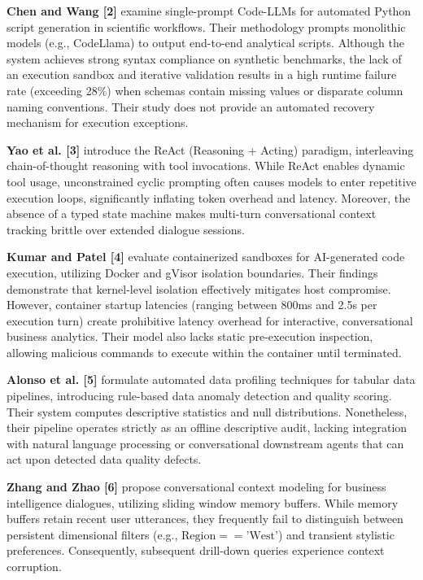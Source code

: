 \documentclass[conference]{IEEEtran}
\begin{document}
\textbf{Chen and Wang [2]} examine single-prompt Code-LLMs for automated Python script generation in scientific workflows. Their methodology prompts monolithic models (e.g., CodeLlama) to output end-to-end analytical scripts. Although the system achieves strong syntax compliance on synthetic benchmarks, the lack of an execution sandbox and iterative validation results in a high runtime failure rate (exceeding 28\%) when schemas contain missing values or disparate column naming conventions. Their study does not provide an automated recovery mechanism for execution exceptions.

\textbf{Yao et al. [3]} introduce the ReAct (Reasoning + Acting) paradigm, interleaving chain-of-thought reasoning with tool invocations. While ReAct enables dynamic tool usage, unconstrained cyclic prompting often causes models to enter repetitive execution loops, significantly inflating token overhead and latency. Moreover, the absence of a typed state machine makes multi-turn conversational context tracking brittle over extended dialogue sessions.

\textbf{Kumar and Patel [4]} evaluate containerized sandboxes for AI-generated code execution, utilizing Docker and gVisor isolation boundaries. Their findings demonstrate that kernel-level isolation effectively mitigates host compromise. However, container startup latencies (ranging between 800ms and 2.5s per execution turn) create prohibitive latency overhead for interactive, conversational business analytics. Their model also lacks static pre-execution inspection, allowing malicious commands to execute within the container until terminated.

\textbf{Alonso et al. [5]} formulate automated data profiling techniques for tabular data pipelines, introducing rule-based data anomaly detection and quality scoring. Their system computes descriptive statistics and null distributions. Nonetheless, their pipeline operates strictly as an offline descriptive audit, lacking integration with natural language processing or conversational downstream agents that can act upon detected data quality defects.

\textbf{Zhang and Zhao [6]} propose conversational context modeling for business intelligence dialogues, utilizing sliding window memory buffers. While memory buffers retain recent user utterances, they frequently fail to distinguish between persistent dimensional filters (e.g., $\text{Region} == \text{'West'}$) and transient stylistic preferences. Consequently, subsequent drill-down queries experience context corruption.
\end{document}
